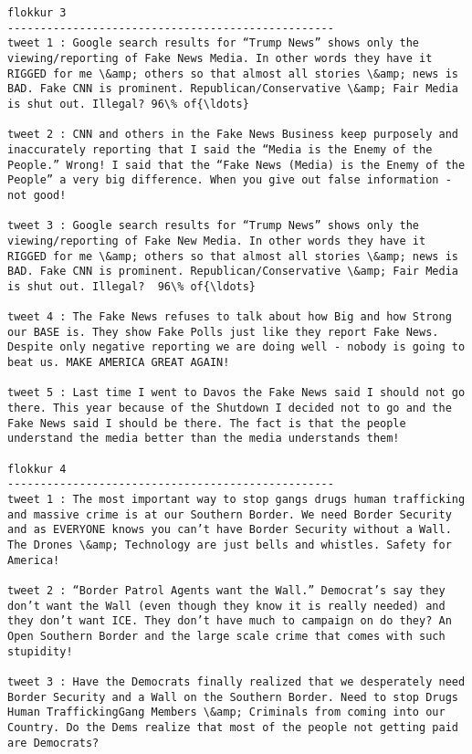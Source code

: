 \documentclass[11pt]{article}
\begin{document}
    \begin{Verbatim}[commandchars=\\\{\}]
flokkur 3
--------------------------------------------------
tweet 1 : Google search results for “Trump News” shows only the viewing/reporting of Fake News Media. In other words they have it RIGGED for me \&amp; others so that almost all stories \&amp; news is BAD. Fake CNN is prominent. Republican/Conservative \&amp; Fair Media is shut out. Illegal? 96\% of{\ldots} 

tweet 2 : CNN and others in the Fake News Business keep purposely and inaccurately reporting that I said the “Media is the Enemy of the People.” Wrong! I said that the “Fake News (Media) is the Enemy of the People” a very big difference. When you give out false information - not good! 

tweet 3 : Google search results for “Trump News” shows only the viewing/reporting of Fake New Media. In other words they have it RIGGED for me \&amp; others so that almost all stories \&amp; news is BAD. Fake CNN is prominent. Republican/Conservative \&amp; Fair Media  is shut out. Illegal?  96\% of{\ldots} 

tweet 4 : The Fake News refuses to talk about how Big and how Strong our BASE is. They show Fake Polls just like they report Fake News. Despite only negative reporting we are doing well - nobody is going to beat us. MAKE AMERICA GREAT AGAIN! 

tweet 5 : Last time I went to Davos the Fake News said I should not go there. This year because of the Shutdown I decided not to go and the Fake News said I should be there. The fact is that the people understand the media better than the media understands them! 

flokkur 4
--------------------------------------------------
tweet 1 : The most important way to stop gangs drugs human trafficking and massive crime is at our Southern Border. We need Border Security and as EVERYONE knows you can’t have Border Security without a Wall. The Drones \&amp; Technology are just bells and whistles. Safety for America! 

tweet 2 : “Border Patrol Agents want the Wall.” Democrat’s say they don’t want the Wall (even though they know it is really needed) and they don’t want ICE. They don’t have much to campaign on do they? An Open Southern Border and the large scale crime that comes with such stupidity! 

tweet 3 : Have the Democrats finally realized that we desperately need Border Security and a Wall on the Southern Border. Need to stop Drugs Human TraffickingGang Members \&amp; Criminals from coming into our Country. Do the Dems realize that most of the people not getting paid are Democrats? 


\end{Verbatim}
\end{document}
